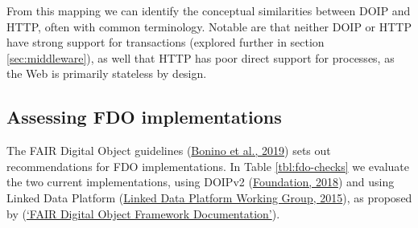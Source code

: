 From this mapping we can identify the conceptual similarities between DOIP and HTTP, often with common terminology. Notable are that neither DOIP or HTTP have strong support for transactions (explored further in section \ref{sec:middleware}), as well that HTTP has poor direct support for processes, as the Web is primarily stateless by design.

\hypertarget{sec:doip-fdo-compare}{%
\subsection{Assessing FDO implementations}\label{sec:doip-fdo-compare}}

The FAIR Digital Object guidelines (\protect\hyperlink{ref-RwvirqWg}{Bonino et al., 2019}) sets out recommendations for FDO implementations. In Table \ref{tbl:fdo-checks} we evaluate the two current implementations, using DOIPv2 (\protect\hyperlink{ref-13TcbsZF6}{Foundation, 2018}) and using Linked Data Platform (\protect\hyperlink{ref-17OHlMRQA}{Linked Data Platform Working Group, 2015}), as proposed by (\protect\hyperlink{ref-7szz7dwO}{{`FAIR Digital Object Framework Documentation'}}).

